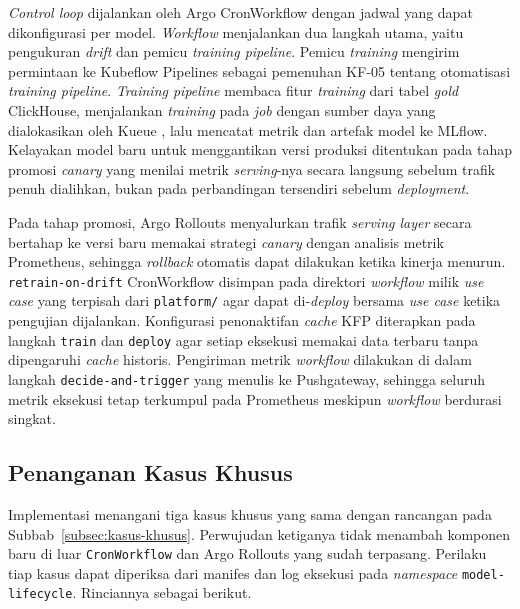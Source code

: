 \textit{Control loop} dijalankan oleh Argo CronWorkflow dengan jadwal yang dapat dikonfigurasi per model. \textit{Workflow} menjalankan dua langkah utama, yaitu pengukuran \textit{drift} dan pemicu \textit{training pipeline}. Pemicu \textit{training} mengirim permintaan ke Kubeflow Pipelines sebagai pemenuhan KF-05 tentang otomatisasi \textit{training pipeline}. \textit{Training pipeline} membaca fitur \textit{training} dari tabel \textit{gold} ClickHouse, menjalankan \textit{training} pada \textit{job} dengan sumber daya yang dialokasikan oleh Kueue \autocite{kueue2024}, lalu mencatat metrik dan artefak model ke MLflow. Kelayakan model baru untuk menggantikan versi produksi ditentukan pada tahap promosi \textit{canary} yang menilai metrik \textit{serving}-nya secara langsung sebelum trafik penuh dialihkan, bukan pada perbandingan tersendiri sebelum \textit{deployment}.

Pada tahap promosi, Argo Rollouts \autocite{argorollouts2025} menyalurkan trafik \textit{serving layer} secara bertahap ke versi baru memakai strategi \textit{canary} dengan analisis metrik Prometheus, sehingga \textit{rollback} otomatis dapat dilakukan ketika kinerja menurun. \texttt{retrain-on-drift} CronWorkflow disimpan pada direktori \textit{workflow} milik \textit{use case} yang terpisah dari \texttt{platform/} agar dapat di-\textit{deploy} bersama \textit{use case} ketika pengujian dijalankan. Konfigurasi penonaktifan \textit{cache} KFP diterapkan pada langkah \texttt{train} dan \texttt{deploy} agar setiap eksekusi memakai data terbaru tanpa dipengaruhi \textit{cache} historis. Pengiriman metrik \textit{workflow} dilakukan di dalam langkah \texttt{decide-and-trigger} yang menulis ke Pushgateway, sehingga seluruh metrik eksekusi tetap terkumpul pada Prometheus meskipun \textit{workflow} berdurasi singkat.

\subsection{Penanganan Kasus Khusus}
\label{subsec:impl-kasus-khusus}

Implementasi menangani tiga kasus khusus yang sama dengan rancangan pada Subbab~\ref{subsec:kasus-khusus}. Perwujudan ketiganya tidak menambah komponen baru di luar \texttt{CronWorkflow} dan Argo Rollouts yang sudah terpasang. Perilaku tiap kasus dapat diperiksa dari manifes dan log eksekusi pada \textit{namespace} \texttt{model-lifecycle}. Rinciannya sebagai berikut.

